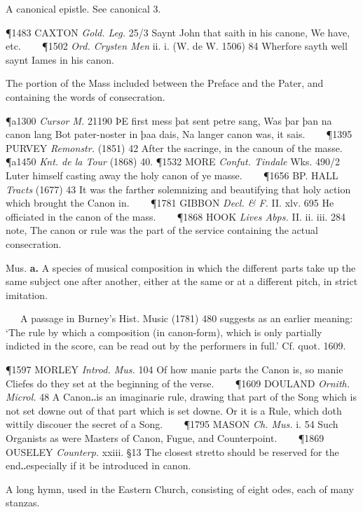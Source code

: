 \begin{description}[wide, labelwidth=!, labelindent=0pt]
\begin{myenumerate}
 A canonical epistle. See canonical 3.

\P 1483 CAXTON  \textit{Gold. Leg.} 25/3 Saynt John that saith in his canone, We have, etc.    
\P 1502 \textit{Ord. Crysten Men} ii. i. (W. de W. 1506) 84 Wherfore sayth well saynt Iames in his canon.

 The portion of the Mass included between the Preface and the Pater, and containing the words of consecration.

\P a1300  \textit{Cursor M.} 21190 ÞE  first mess þat sent petre sang, Was þar þan na canon lang Bot pater-noster in þaa dais, Na langer canon was, it sais.    
\P 1395 PURVEY  \textit{Remonstr.} (1851) 42 After the sacringe, in the canoun of the masse.
\P a1450 \textit{Knt. de la Tour} (1868) 40. 
\P 1532 MORE  \textit{Confut. Tindale} Wks. 490/2 Luter himself casting away the holy canon of ye masse.    
\P 1656 BP. HALL  \textit{Tracts} (1677) 43 It was the farther solemnizing and beautifying that holy action which brought the Canon in.    
\P 1781 GIBBON  \textit{Decl. \& F.} II. xlv. 695 He officiated in the canon of the mass.    
\P 1868 HOOK  \textit{Lives Abps.} II. ii. iii. 284 note, The canon or rule was the part of the service containing the actual consecration.

 Mus. \textbf{a.} A species of musical composition in which the different parts take up the same subject one after another, either at the same or at a different pitch, in strict imitation.

   A passage in Burney's Hist. Music (1781) 480 suggests as an earlier meaning: ‘The rule by which a composition (in canon-form), which is only partially indicted in the score, can be read out by the performers in full.’ Cf. quot. 1609.

\P 1597 MORLEY  \textit{Introd. Mus.} 104 Of how manie parts the Canon is, so manie Cliefes do they set at the beginning of the verse.    
\P 1609 DOULAND  \textit{Ornith. Microl.} 48 A Canon‥is an imaginarie rule, drawing that part of the Song which is not set downe out of that part which is set downe. Or it is a Rule, which doth wittily discouer the secret of a Song.    
\P 1795 MASON  \textit{Ch. Mus.} i. 54 Such Organists as were Masters of Canon, Fugue, and Counterpoint.    
\P 1869 OUSELEY  \textit{Counterp.} xxiii. §13 The closest stretto should be reserved for the end‥especially if it be introduced in canon.

 A long hymn, used in the Eastern Church, consisting of eight odes, each of many stanzas.


\end{myenumerate}
\end{description}
